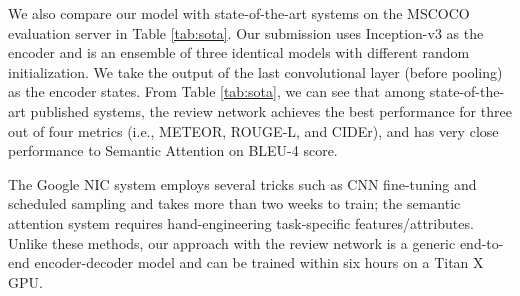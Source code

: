 \documentclass{article}
\begin{document}
We also compare our model with state-of-the-art systems on the MSCOCO evaluation server in Table \ref{tab:sota}. Our submission uses Inception-v3 \cite{szegedy2015rethinking} as the encoder and is an ensemble of three identical models with different random initialization. We take the output of the last convolutional layer (before pooling) as the encoder states. From Table \ref{tab:sota}, we can see that among state-of-the-art published systems, the review network achieves the best performance for three out of four metrics (i.e., METEOR, ROUGE-L, and CIDEr), and has very close performance to Semantic Attention \cite{you2016image} on BLEU-4 score.

The Google NIC system \cite{vinyals2015show} employs several tricks such as CNN fine-tuning and scheduled sampling and takes more than two weeks to train; the semantic attention system requires hand-engineering task-specific features/attributes. Unlike these methods, our approach with the review network is a generic end-to-end encoder-decoder model and can be trained within six hours on a Titan X GPU.
\end{document}
